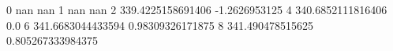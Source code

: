 0 nan nan
1 nan nan
2 339.4225158691406 -1.2626953125
4 340.6852111816406 0.0
6 341.6683044433594 0.98309326171875
8 341.490478515625 0.805267333984375

